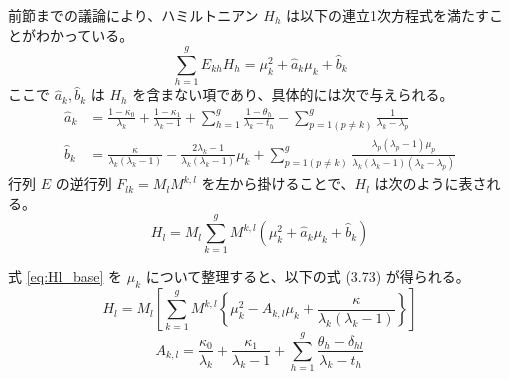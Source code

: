 前節までの議論により、ハミルトニアン $H_h$ は以下の連立1次方程式を満たすことがわかっている。
\begin{equation*}
    \sum_{h=1}^g E_{kh} H_h = \mu_k^2 + \hat{a}_k \mu_k + \hat{b}_k
\end{equation*}
ここで $\hat{a}_k, \hat{b}_k$ は $H_h$ を含まない項であり、具体的には次で与えられる。
\begin{align*}
    \hat{a}_k &= \frac{1-\kappa_0}{\lambda_k} + \frac{1-\kappa_1}{\lambda_k-1} + \sum_{h=1}^g \frac{1-\theta_h}{\lambda_k-t_h} - \sum_{p=1 (p \neq k)}^g \frac{1}{\lambda_k-\lambda_p} \\
    \hat{b}_k &= \frac{\kappa}{\lambda_k(\lambda_k-1)} - \frac{2\lambda_k-1}{\lambda_k(\lambda_k-1)}\mu_k + \sum_{p=1 (p \neq k)}^g \frac{\lambda_p(\lambda_p-1)\mu_p}{\lambda_k(\lambda_k-1)(\lambda_k-\lambda_p)}
\end{align*}
行列 $E$ の逆行列 $F_{lk} = M_l M^{k,l}$ を左から掛けることで、$H_l$ は次のように表される。
\begin{equation}
    H_l = M_l \sum_{k=1}^g M^{k,l} \left( \mu_k^2 + \hat{a}_k \mu_k + \hat{b}_k \right) \label{eq:Hl_base}
\end{equation}

\begin{theorem}[ハミルトニアンの最終形態]
式 \eqref{eq:Hl_base} を $\mu_k$ について整理すると、以下の式 (3.73) が得られる。
\begin{equation}
    H_l = M_l \left[ \sum_{k=1}^g M^{k,l} \left\{ \mu_k^2 - A_{k,l}\mu_k + \frac{\kappa}{\lambda_k(\lambda_k-1)} \right\} \right] \label{eq:3.73}
\end{equation}
\begin{equation*}
    A_{k,l} = \frac{\kappa_0}{\lambda_k} + \frac{\kappa_1}{\lambda_k-1} + \sum_{h=1}^g \frac{\theta_h - \delta_{hl}}{\lambda_k - t_h}
\end{equation*}
\end{theorem}

